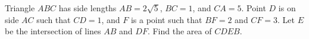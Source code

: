 Triangle $ABC$ has side lengths $AB=2\sqrt{5}$, $BC=1$, and $CA=5$. Point $D$ is on side $AC$ such that $CD=1$, and $F$ is a point such that $BF=2$ and $CF=3$. Let $E$ be the intersection of lines $AB$ and $DF$. Find the area of $CDEB$.